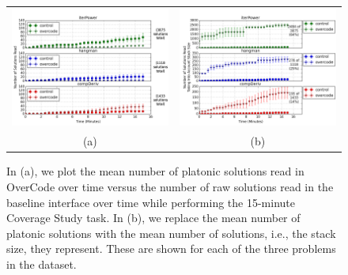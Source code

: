 \begin{figure}[b!]
\begin{tabular}{c | c}
\begin{minipage}{.5\linewidth}
\centering
\includegraphics[width=\linewidth]{Body/figures/overcode/prettyReadCoverage.png}
\end{minipage}
&
\begin{minipage}{.5\linewidth}
\centering
\includegraphics[width=\linewidth]{Body/figures/overcode/prettyPercentCoverage.png}
\end{minipage}
\\
(a) & (b)
\end{tabular}
\caption{In (a), we plot the mean number of platonic solutions read in OverCode over time versus the number of raw solutions read in the baseline interface over time while performing the 15-minute Coverage Study task. In (b), we replace the mean number of platonic solutions with the mean number of solutions, i.e., the stack size, they represent. These are shown for each of the three problems in the dataset.}
\label{readCoverage}
\end{figure}

